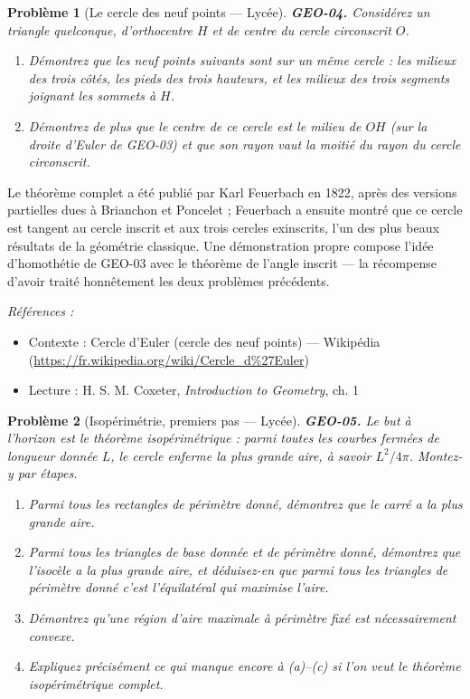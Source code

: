 \documentclass[11pt]{article}
\newtheorem{problem}{Problème}
\newenvironment{refs}{\par\small\noindent\emph{Références :}\begin{itemize}\setlength\itemsep{0pt}}{\end{itemize}\normalsize}
\begin{document}
\bigskip

\begin{problem}[{Le cercle des neuf points --- Lycée}]
\textbf{GEO-04.} Considérez un triangle quelconque, d'orthocentre $ H $ et de centre du
cercle circonscrit $ O $.
\begin{enumerate}
\item[(a)] Démontrez que les neuf points suivants sont sur un même cercle : les milieux des trois
côtés, les pieds des trois hauteurs, et les milieux des trois segments joignant les sommets
à $ H $.
\item[(b)] Démontrez de plus que le centre de ce cercle est le milieu de $ OH $ (sur la droite
d'Euler de GEO-03) et que son rayon vaut la moitié du rayon du cercle circonscrit.
\end{enumerate}

\end{problem}

\noindent Le théorème complet a été publié par Karl Feuerbach en 1822, après des
versions partielles dues à Brianchon et Poncelet ; Feuerbach a ensuite montré que ce cercle
est tangent au cercle inscrit et aux trois cercles exinscrits, l'un des plus beaux résultats
de la géométrie classique. Une démonstration propre compose l'idée d'homothétie de GEO-03 avec
le théorème de l'angle inscrit --- la récompense d'avoir traité honnêtement les deux problèmes
précédents.

\begin{refs}
\item Contexte : Cercle d'Euler (cercle des neuf points) --- Wikipédia (\url{https://fr.wikipedia.org/wiki/Cercle_d%27Euler})
\item Lecture : H. S. M. Coxeter, \textit{Introduction to Geometry}, ch. 1
\end{refs}

\bigskip

\begin{problem}[{Isopérimétrie, premiers pas --- Lycée}]
\textbf{GEO-05.} Le but à l'horizon est le théorème isopérimétrique : parmi toutes les
courbes fermées de longueur donnée $ L $, le cercle enferme la plus grande aire, à savoir
$ L^2/4\pi $. Montez-y par étapes.
\begin{enumerate}
\item[(a)] Parmi tous les rectangles de périmètre donné, démontrez que le carré a la plus grande
aire.
\item[(b)] Parmi tous les triangles de base donnée et de périmètre donné, démontrez que l'isocèle a
la plus grande aire, et déduisez-en que parmi tous les triangles de périmètre donné c'est
l'équilatéral qui maximise l'aire.
\item[(c)] Démontrez qu'une région d'aire maximale à périmètre fixé est nécessairement convexe.
\item[(d)] Expliquez précisément ce qui manque encore à (a)--(c) si l'on veut le théorème
isopérimétrique complet.
\end{enumerate}

\end{problem}
\end{document}
